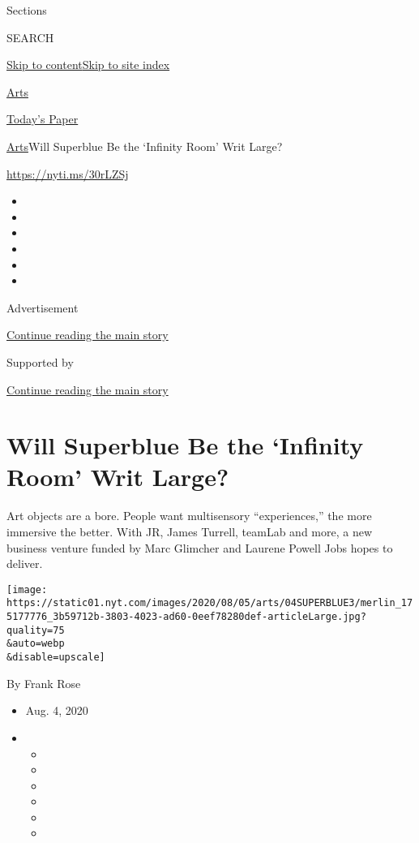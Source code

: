 Sections

SEARCH

\protect\hyperlink{site-content}{Skip to
content}\protect\hyperlink{site-index}{Skip to site index}

\href{https://www.nytimes.com/section/arts}{Arts}

\href{https://myaccount.nytimes.com/auth/login?response_type=cookie\&client_id=vi}{}

\href{https://www.nytimes.com/section/todayspaper}{Today's Paper}

\href{/section/arts}{Arts}\textbar{}Will Superblue Be the `Infinity
Room' Writ Large?

\url{https://nyti.ms/30rLZSj}

\begin{itemize}
\item
\item
\item
\item
\item
\item
\end{itemize}

Advertisement

\protect\hyperlink{after-top}{Continue reading the main story}

Supported by

\protect\hyperlink{after-sponsor}{Continue reading the main story}

\hypertarget{will-superblue-be-the-infinity-room-writ-large}{%
\section{Will Superblue Be the `Infinity Room' Writ
Large?}\label{will-superblue-be-the-infinity-room-writ-large}}

Art objects are a bore. People want multisensory ``experiences,'' the
more immersive the better. With JR, James Turrell, teamLab and more, a
new business venture funded by Marc Glimcher and Laurene Powell Jobs
hopes to deliver.

\texttt{[image: https://static01.nyt.com/images/2020/08/05/arts/04SUPERBLUE3/merlin\_175177776\_3b59712b-3803-4023-ad60-0eef78280def-articleLarge.jpg?quality=75\\\&auto=webp\\\&disable=upscale]}

By Frank Rose

\begin{itemize}
\item
  Aug. 4, 2020
\item
  \begin{itemize}
  \item
  \item
  \item
  \item
  \item
  \item
  \end{itemize}
\end{itemize}

